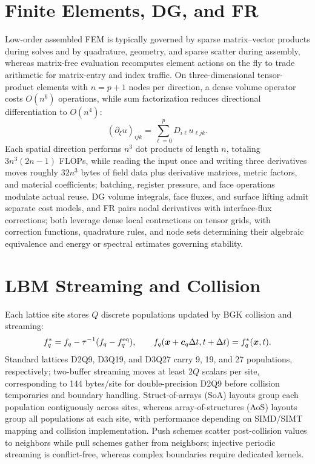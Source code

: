 \section{Finite Elements, DG, and FR}
Low-order assembled FEM is typically governed by sparse matrix--vector products during solves and by quadrature, geometry, and sparse scatter during assembly, whereas matrix-free evaluation recomputes element actions on the fly to trade arithmetic for matrix-entry and index traffic.
On three-dimensional tensor-product elements with $n=p+1$ nodes per direction, a dense volume operator costs $O(n^6)$ operations, while sum factorization reduces directional differentiation to $O(n^4)$:
\[
 (\partial_\xi u)_{ijk}=\sum_{\ell=0}^{p}D_{i\ell}u_{\ell jk}.
\]
Each spatial direction performs $n^3$ dot products of length $n$, totaling $3n^3(2n-1)$ FLOPs, while reading the input once and writing three derivatives moves roughly $32n^3$ bytes of field data plus derivative matrices, metric factors, and material coefficients; batching, register pressure, and face operations modulate actual reuse.
DG volume integrals, face fluxes, and surface lifting admit separate cost models, and FR pairs nodal derivatives with interface-flux corrections; both leverage dense local contractions on tensor grids, with correction functions, quadrature rules, and node sets determining their algebraic equivalence and energy or spectral estimates governing stability.
\section{LBM Streaming and Collision}
Each lattice site stores $Q$ discrete populations updated by BGK collision and streaming:
\[
 f_q^*=f_q-\tau^{-1}(f_q-f_q^{\rm eq}),\qquad
 f_q(\bm x+\bm c_q\Delta t,t+\Delta t)=f_q^*(\bm x,t).
\]
Standard lattices D2Q9, D3Q19, and D3Q27 carry 9, 19, and 27 populations, respectively; two-buffer streaming moves at least $2Q$ scalars per site, corresponding to 144 bytes/site for double-precision D2Q9 before collision temporaries and boundary handling.
Struct-of-arrays (SoA) layouts group each population contiguously across sites, whereas array-of-structures (AoS) layouts group all populations at each site, with performance depending on SIMD/SIMT mapping and collision implementation. Push schemes scatter post-collision values to neighbors while pull schemes gather from neighbors; injective periodic streaming is conflict-free, whereas complex boundaries require dedicated kernels.
